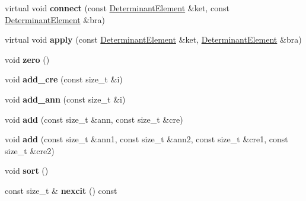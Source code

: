 \begin{DoxyCompactItemize}
\item 
virtual void {\bfseries connect} (const \hyperlink{classDeterminantElement}{Determinant\+Element} \&ket, const \hyperlink{classDeterminantElement}{Determinant\+Element} \&bra)\hypertarget{classConnection_a0c843525d4e2934fdaf10e9fad2bd50a}{}\label{classConnection_a0c843525d4e2934fdaf10e9fad2bd50a}

\item 
virtual void {\bfseries apply} (const \hyperlink{classDeterminantElement}{Determinant\+Element} \&ket, \hyperlink{classDeterminantElement}{Determinant\+Element} \&bra)\hypertarget{classConnection_a81b694174d09ef90256f705410b651e7}{}\label{classConnection_a81b694174d09ef90256f705410b651e7}

\item 
void {\bfseries zero} ()\hypertarget{classConnection_a07e46eda12da6ff7e5cfb66b00f716ac}{}\label{classConnection_a07e46eda12da6ff7e5cfb66b00f716ac}

\item 
void {\bfseries add\+\_\+cre} (const size\+\_\+t \&i)\hypertarget{classConnection_af617fea5e5082c941470eae7a795367c}{}\label{classConnection_af617fea5e5082c941470eae7a795367c}

\item 
void {\bfseries add\+\_\+ann} (const size\+\_\+t \&i)\hypertarget{classConnection_ad967f8812d0598ba228ef16b2f7436a5}{}\label{classConnection_ad967f8812d0598ba228ef16b2f7436a5}

\item 
void {\bfseries add} (const size\+\_\+t \&ann, const size\+\_\+t \&cre)\hypertarget{classConnection_af167b1fd395bceea3540d720437adf55}{}\label{classConnection_af167b1fd395bceea3540d720437adf55}

\item 
void {\bfseries add} (const size\+\_\+t \&ann1, const size\+\_\+t \&ann2, const size\+\_\+t \&cre1, const size\+\_\+t \&cre2)\hypertarget{classConnection_a4a7ab2893fb8b3a21162a055c3065c3c}{}\label{classConnection_a4a7ab2893fb8b3a21162a055c3065c3c}

\item 
void {\bfseries sort} ()\hypertarget{classConnection_ae50daf05c5a97ea366f26cbd7e2d0fe7}{}\label{classConnection_ae50daf05c5a97ea366f26cbd7e2d0fe7}

\item 
const size\+\_\+t \& {\bfseries nexcit} () const \hypertarget{classConnection_a7e83ced8023d813160513729b9216ede}{}\label{classConnection_a7e83ced8023d813160513729b9216ede}

\end{DoxyCompactItemize}
